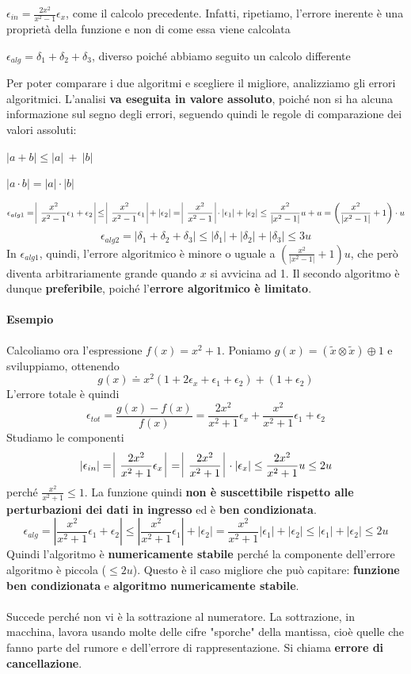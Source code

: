\documentclass[10pt]{book}
\begin{document}
\begin{list}{}{Notiamo come}
	\item $\epsilon_{in} = \frac{2x^2}{x^2 - 1}\epsilon_x$, come il calcolo precedente. Infatti, ripetiamo, l'errore inerente è una proprietà della funzione e non di come essa viene calcolata
	\item $\epsilon_{alg} = \delta_1 + \delta_2 + \delta_3$, diverso poiché abbiamo seguito un calcolo differente
\end{list}
Per poter comparare i due algoritmi e scegliere il migliore, analizziamo gli errori algoritmici. L'analisi \textbf{va eseguita in valore assoluto}, poiché non si ha alcuna informazione sul segno degli errori, seguendo quindi le regole di comparazione dei valori assoluti:
\begin{list}{}{}
	\item $|a + b| \leq |a|\:+\:|b|$
	\item $|a\cdot b| = |a|\cdot|b|$
\end{list}
$$\epsilon_{alg1} = \:\vline\:\frac{x^2}{x^2 - 1}\epsilon_1 + \epsilon_2\:\vline \leq \:\vline\:\frac{x^2}{x^2 - 1}\epsilon_1\:\vline + |\epsilon_2| = \:\vline\:\frac{x^2}{x^2 - 1}\:\vline\cdot|\epsilon_1| + |\epsilon_2| \leq \frac{x^2}{|x^2 - 1|}u + u = \left(\frac{x^2}{|x^2 - 1|} + 1\right)\cdot u$$
$$\epsilon_{alg2} = |\delta_1 + \delta_2 + \delta_3| \leq |\delta_1| + |\delta_2| + |\delta_3| \leq 3u$$
In $\epsilon_{alg1}$, quindi, l'errore algoritmico è minore o uguale a $(\frac{x^2}{|x^2 - 1|} + 1)u$, che però diventa arbitrariamente grande quando $x$ si avvicina ad 1. Il secondo algoritmo è dunque \textbf{preferibile}, poiché l'\textbf{errore algoritmico è limitato}.
\paragraph{Esempio} Calcoliamo ora l'espressione $f(x) = x^2 + 1$. Poniamo $g(x) = (\tilde{x} \otimes \tilde{x}) \oplus 1$ e sviluppiamo, ottenendo $$g(x) \doteq x^2(1 + 2\epsilon_x + \epsilon_1 + \epsilon_2) + (1 + \epsilon_2)$$
L'errore totale è quindi
$$\epsilon_{tot} = \frac{g(x) - f(x)}{f(x)} = \frac{2x^2}{x^2 + 1}\epsilon_x + \frac{x^2}{x^2 + 1}\epsilon_1 + \epsilon_2$$ Studiamo le componenti
$$|\epsilon_{in}| = \:\vline\:\frac{2x^2}{x^2 + 1}\epsilon_x\:\vline\: = \:\vline\:\frac{2x^2}{x^2 + 1}\:\vline\:\cdot|\epsilon_x| \leq \frac{2x^2}{x^2 + 1}u \leq 2u$$ perché $\frac{x^2}{x^2 + 1} \leq 1$. La funzione quindi \textbf{non è suscettibile rispetto alle perturbazioni dei dati in ingresso} ed è \textbf{ben condizionata}.
$$\epsilon_{alg} = |\frac{x^2}{x^2 + 1}\epsilon_1 + \epsilon_2| \leq |\frac{x^2}{x^2 + 1}\epsilon_1| + |\epsilon_2| = \frac{x^2}{x^2 + 1}|\epsilon_1| + |\epsilon_2| \leq |\epsilon_1| + |\epsilon_2| \leq 2u$$ Quindi l'algoritmo è \textbf{numericamente stabile} perché la componente dell'errore algoritmo è piccola ($\leq 2u$). Questo è il caso migliore che può capitare: \textbf{funzione ben condizionata} e \textbf{algoritmo numericamente stabile}.\\\\
Succede perché non vi è la sottrazione al numeratore. La sottrazione, in macchina, lavora usando molte delle cifre "sporche" della mantissa, cioè quelle che fanno parte del rumore e dell'errore di rappresentazione. Si chiama \textbf{errore di cancellazione}.
\end{document}
